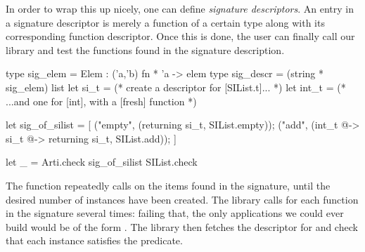 In order to wrap this up nicely, one can define \emph{signature descriptors}. An
entry in a signature descriptor is merely a function of a certain
type  along with its corresponding function descriptor. Once this is
done, the user can finally call our library and test the functions found in the
signature description.
%
\begin{ocamlcode}
type sig_elem = Elem : ('a,'b) fn * 'a -> elem
type sig_descr = (string * sig_elem) list
let si_t  =
  (* create a descriptor for [SIList.t]... *)
let int_t =
  (* ...and one for [int], with a [fresh] function *)

let sig_of_silist = [
  ("empty", (returning si_t, SIList.empty));
  ("add", (int_t @-> si_t @-> returning si_t, SIList.add));
]

let _ =
  Arti.check sig_of_silist SIList.check
\end{ocamlcode}
%
The  function repeatedly calls  on the items found in
the signature, until the desired number of instances have been created. The
library calls  for each function in the signature several times:
failing that, the only applications we could ever build would be of the form
. The library then fetches the descriptor for 
and check that each instance satisfies the  predicate.
